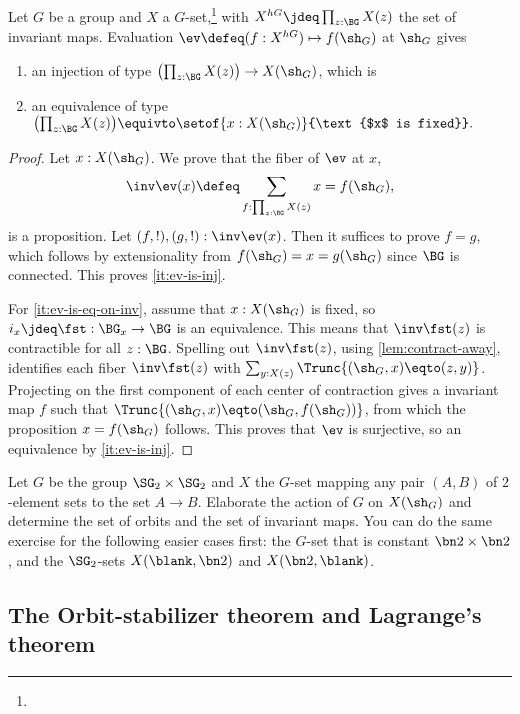 \begin{lemma}\label{lem:fixpts-are-fixed}
  Let $G$ be a group and $X$ a $G$-set,\footnote{}
  with $X^{hG} \jdeq \prod_{z:\BG}X(z)$
  the set of invariant maps. 
  Evaluation $\ev\defeq(f:X^{hG})\mapsto f(\sh_G)$ at $\sh_G$ gives
  \begin{enumerate}
  \item\label{it:ev-is-inj} 
  an injection of type $\bigl(\prod_{z:\BG}X(z)\bigr) \to X(\sh_G)$, which is
  \item\label{it:ev-is-eq-on-inv} an equivalence of type 
  $\bigl(\prod_{z:\BG}X(z)\bigr) \equivto
  \setof{x : X(\sh_G)}{\text{$x$ is fixed}}.$
  \end{enumerate}
\end{lemma}
\begin{proof}
  Let $x : X(\sh_G)$. We prove that the fiber of $\ev$ at $x$,
  \[
    \inv\ev(x) \defeq \sum_{f : \prod_{z:\BG}X(z)} x=f(\sh_G),
  \]
  is a proposition. Let $(f,!),(g,!) : \inv\ev(x)$. 
  Then it suffices to prove $f=g$, which follows by extensionality
  from $f(\sh_G)=x=g(\sh_G)$ since $\BG$ is connected. This proves
  \ref{it:ev-is-inj}.
  
  For \ref{it:ev-is-eq-on-inv}, assume that
  $x : X(\sh_G)$ is fixed, so $i_x\jdeq\fst:\BG_x \to \BG$
  is an equivalence. This means that $\inv\fst(z)$ is contractible
  for all $z:\BG$. Spelling out $\inv\fst(z)$, using \cref{lem:contract-away},
  identifies each fiber $\inv\fst(z)$ with
  $\sum_{y:X(z)}\Trunc{(\sh_G,x)\eqto(z,y)}$.
  Projecting on the first component of each center of contraction
  gives a invariant map $f$ such that $\Trunc{(\sh_G,x)\eqto(\sh_G,f(\sh_G))}$,
  from which the proposition $x=f(\sh_G)$ follows. This proves that
  $\ev$ is surjective, so an equivalence by \ref{it:ev-is-inj}.
\end{proof}

\begin{xca}\label{xca:Gset-A->B}
Let $G$ be the group $\SG_2\times\SG_2$ and $X$ the $G$-set mapping
any pair $(A,B)$ of $2$-element sets to the set $A\to B$.
Elaborate the action of $G$ on $X(\sh_G)$ and determine the
set of orbits and the set of invariant maps. You can
do the same exercise for the following easier cases first:
the $G$-set that is constant $\bn2\times\bn2$, and
the $\SG_2$-sets $X(\blank,\bn2)$ and $X(\bn2,\blank)$.
\end{xca}

\subsection{The Orbit-stabilizer theorem and Lagrange's theorem}

